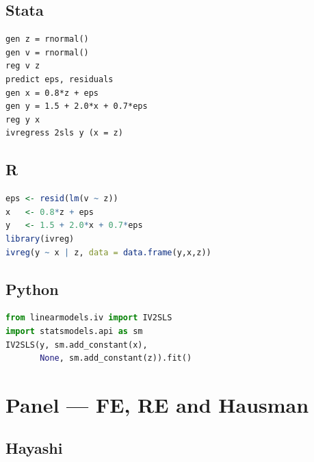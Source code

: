 \subsection*{Stata}

\begin{lstlisting}[language={}, basicstyle=\ttfamily\small,
  frame=single, numbers=none, backgroundcolor=\color{codbg}]
gen z = rnormal()
gen v = rnormal()
reg v z
predict eps, residuals
gen x = 0.8*z + eps
gen y = 1.5 + 2.0*x + 0.7*eps
reg y x
ivregress 2sls y (x = z)
\end{lstlisting}

\subsection*{R}

\begin{lstlisting}[language=R, basicstyle=\ttfamily\small,
  frame=single, numbers=none, backgroundcolor=\color{codbg},
  keywordstyle=\color{keyword}\bfseries,
  stringstyle=\color{string},
  commentstyle=\color{comment}\itshape]
eps <- resid(lm(v ~ z))
x   <- 0.8*z + eps
y   <- 1.5 + 2.0*x + 0.7*eps
library(ivreg)
ivreg(y ~ x | z, data = data.frame(y,x,z))
\end{lstlisting}

\subsection*{Python}

\begin{lstlisting}[language=Python, basicstyle=\ttfamily\small,
  frame=single, numbers=none, backgroundcolor=\color{codbg},
  keywordstyle=\color{keyword}\bfseries,
  stringstyle=\color{string},
  commentstyle=\color{comment}\itshape]
from linearmodels.iv import IV2SLS
import statsmodels.api as sm
IV2SLS(y, sm.add_constant(x),
       None, sm.add_constant(z)).fit()
\end{lstlisting}

\section{Panel — FE, RE and Hausman}

\subsection*{Hayashi}


